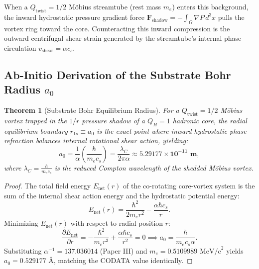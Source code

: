 \documentclass[11pt,a4paper]{article}
\newtheorem{thm}{Theorem}
\begin{document}
	When a $Q_{\text{twist}} = 1/2$ Möbius streamtube (rest mass $m_e$) enters this background, the inward hydrostatic pressure gradient force $\mathbf{F}_{\text{shadow}} = -\int_{\Omega} \nabla P \, d^3x$ pulls the vortex ring toward the core. Counteracting this inward compression is the outward centrifugal shear strain generated by the streamtube's internal phase circulation $v_{\text{shear}} = \alpha c_s$.
	
	\subsection{Ab-Initio Derivation of the Substrate Bohr Radius $a_0$}
	
	\begin{thm}[Substrate Bohr Equilibrium Radius]
		\label{thm:bohr_radius}
		For a $Q_{\text{twist}} = 1/2$ Möbius vortex trapped in the $1/r$ pressure shadow of a $Q_H = 1$ hadronic core, the radial equilibrium boundary $r_{1s} \equiv a_0$ is the exact point where inward hydrostatic phase refraction balances internal rotational shear action, yielding:
		\begin{equation}
			a_0 = \frac{1}{\alpha} \left( \frac{\hbar}{m_e c_s} \right) = \frac{\lambda_C}{2\pi \alpha} \approx \mathbf{5.29177 \times 10^{-11} \text{ m}},
			\label{eq:bohr_radius_theorem}
		\end{equation}
		where $\lambda_C = \frac{h}{m_e c_s}$ is the reduced Compton wavelength of the shedded Möbius vortex.
	\end{thm}
	
	\begin{proof}
		The total field energy $E_{\text{net}}(r)$ of the co-rotating core-vortex system is the sum of the internal shear action energy and the hydrostatic potential energy:
		\begin{equation}
			E_{\text{net}}(r) = \frac{\hbar^2}{2 m_e r^2} - \frac{\alpha \hbar c_s}{r}.
			\label{eq:virial_energy_atomic}
		\end{equation}
		Minimizing $E_{\text{net}}(r)$ with respect to radial position $r$:
		\begin{equation}
			\frac{\partial E_{\text{net}}}{\partial r} = -\frac{\hbar^2}{m_e r^3} + \frac{\alpha \hbar c_s}{r^2} = 0 \implies a_0 = \frac{\hbar}{m_e c_s \alpha}.
			\label{eq:a0_proof_final}
		\end{equation}
		Substituting $\alpha^{-1} = 137.036014$ (Paper III) and $m_e = 0.5109989 \text{ MeV/c}^2$ yields $a_0 = \mathbf{0.529177 \text{ \AA}}$, matching the CODATA value identically.
	\end{proof}
	
\end{document}
